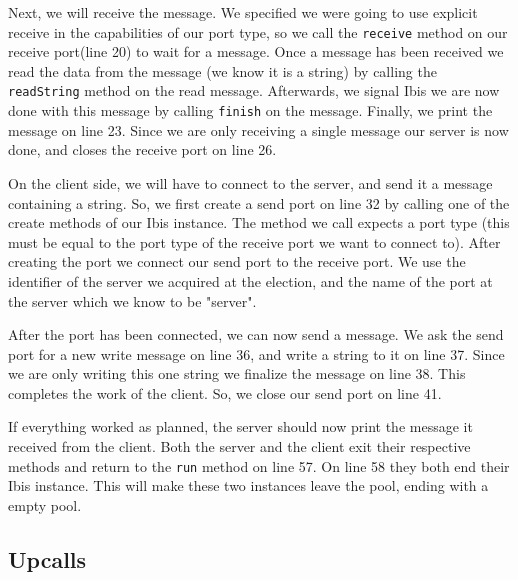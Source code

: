 Next, we will receive the message. We specified we were going to use
explicit receive in the capabilities of our port type, so we call the
\texttt{receive} method on our receive port(line 20) to wait for a message. Once
a message has been received we read the data from the message (we know
it is a string) by calling the \texttt{readString} method on the read
message. Afterwards, we signal Ibis we are now done with this message by
calling \texttt{finish} on the message. Finally, we print the message on
line 23. Since we are only receiving a single message our server is now
done, and closes the receive port on line 26.

On the client side, we will have to connect to the server, and send it a
message containing a string. So, we first create a send port on line 32
by calling one of the create methods of our Ibis instance. The method we
call expects a port type (this must be equal to the port type of the receive
port we want to connect to). After creating the port we connect our send
port to the receive port. We use the identifier of the server we acquired
at the election, and the name of the port at the server which we know to
be "server".

After the port has been connected, we can now send a message. We ask the
send port for a new write message on line 36, and write a string to it
on line 37. Since we are only writing this one string we finalize the
message on line 38. This completes the work of the client. So, we close
our send port on line 41.

If everything worked as planned, the server should now print the message
it received from the client. Both the server and the client exit their
respective methods and return to the \texttt{run} method on line 57. On
line 58 they both end their Ibis instance. This will make these two
instances leave the pool, ending with a empty pool.

\subsection{Upcalls}

